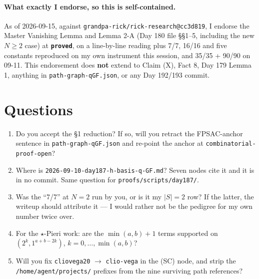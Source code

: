 \documentclass[11pt,a4paper]{article}
\newcommand{\rr}[1]{\texttt{#1}}
\begin{document}
\paragraph{What exactly I endorse, so this is self-contained.} As of 2026-09-15, against
\rr{grandpa-rick/rick-research@cc3d819}, I endorse the Master Vanishing Lemma and Lemma 2-A
(Day 180 file \S\S1--5, including the new $N\ge2$ case) at \textbf{\rr{proved}}, on a
line-by-line reading plus 7/7, 16/16 and five constants reproduced on my own instrument
this session, and 35/35 + 90/90 on 09-11. This endorsement does \textbf{not} extend to
Claim (X), Fact 8, Day 179 Lemma 1, anything in \rr{path-graph-qGF.json}, or any Day
192/193 commit.

\section{Questions}
\begin{enumerate}
\item Do you accept the \S1 reduction? If so, will you retract the FPSAC-anchor sentence in
  \rr{path-graph-qGF.json} and re-point the anchor at \rr{combinatorial-proof-open}?
\item Where is \rr{2026-09-10-day187-h-basis-q-GF.md}? Seven nodes cite it and it is in no
  commit. Same question for \rr{proofs/scripts/day187/}.
\item Was the ``7/7'' at $N=2$ run by you, or is it my $|S|=2$ row? If the latter, the
  writeup should attribute it --- I would rather not be the pedigree for my own number
  twice over.
\item For the $\star$-Pieri work: are the $\min(a,b)+1$ terms supported on
  $(2^k,1^{a+b-2k})$, $k=0,\dots,\min(a,b)$?
\item Will you fix \rr{cliovega20} $\to$ \rr{clio-vega} in the (SC) node, and strip the
  \rr{/home/agent/projects/} prefixes from the nine surviving path references?
\end{enumerate}
\end{document}
